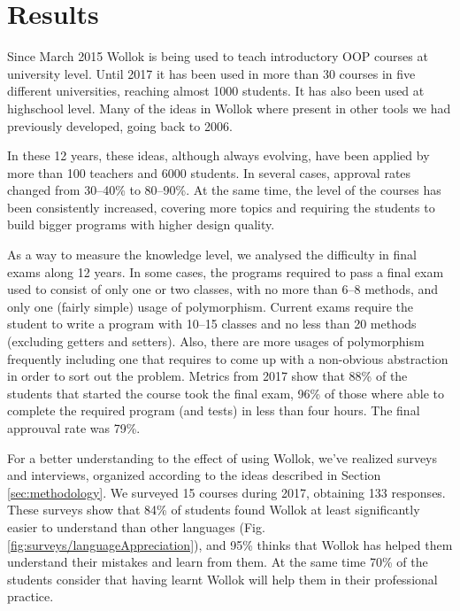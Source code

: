 \section{Results}
\label{sec:results}
Since March 2015 Wollok is being used to teach introductory OOP courses at university level.
Until 2017 it has been used in more than 30 courses in five different universities, reaching almost 1000 students.
It has also been used at highschool level.
Many of the ideas in Wollok where present in other tools we had previously developed, going back to 2006. 

In these 12 years, these ideas, although always evolving, have been applied by more than 100 teachers and 6000 students. 
In several cases, approval rates changed from 30--40\% to 80--90\%.
At the same time, the level of the courses has been consistently increased, 
covering more topics and requiring the students to build bigger programs with higher design quality.


As a way to measure the knowledge level, we analysed the difficulty in final exams along 12 years.
In some cases, the programs required to pass a final exam used to consist of only one or two classes, 
with no more than 6--8 methods, and only one (fairly simple) usage of polymorphism.
Current exams require the student to write a program with 10--15 classes and no less than 20 methods (excluding getters and setters).
Also, there are more usages of polymorphism 
frequently including one that requires to come up with a non-obvious abstraction in order to sort out the problem.
Metrics from 2017 show that 88\% of the students that started the course took the final exam,
96\% of those where able to complete the required program (and tests) in less than four hours.
The final approuval rate was 79\%.

\medskip

For a better understanding to the effect of using Wollok, we've realized surveys and interviews, organized according to the ideas described in Section \ref{sec:methodology}.
We surveyed 15 courses during 2017, obtaining 133 responses.
These surveys show that 84\% of students found Wollok at least significantly easier to understand than other languages (\cf Fig. \ref{fig:surveys/languageAppreciation}),
and 95\% thinks that Wollok has helped them understand their mistakes and learn from them.
At the same time 70\% of the students consider that having learnt Wollok will help them in their professional practice.

